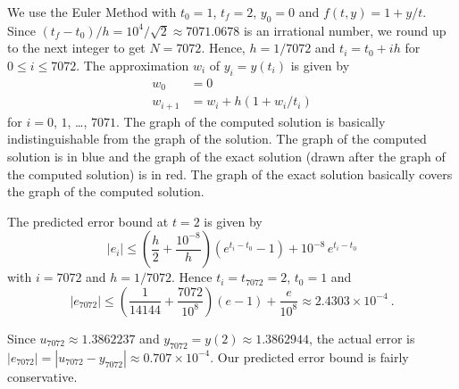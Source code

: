 { We use the Euler Method with $t_0=1$, $t_f= 2$,
$y_0 = 0$ and $f(t,y) = 1 + y/t$.  Since
$\displaystyle (t_f-t_0)/h = 10^4/\sqrt{2} \approx 7071.0678$
is an irrational number, we round up to the next integer to get
$N = 7072$.   Hence, $h = 1/7072$ and $t_i = t_0 + ih$ for
$0\leq i \leq 7072$.  The approximation $w_i$ of $y_i = y(t_i)$ is
given by
\begin{align*}
w_0 & = 0 \\
w_{i+1} & = w_i + h(1 + w_i/t_i)
\end{align*}
for $i=0$, $1$, \ldots, $7071$.   The graph of the computed solution
is basically indistinguishable from the graph of the solution.
The graph of the computed solution is in blue and the graph of the
exact solution (drawn after the graph of the computed solution) is in
red.  The graph of the exact solution basically covers the graph of the
computed solution.

  The predicted error bound at $t=2$ is given by
\[
|e_i| \leq \left(\frac{h}{2} + \frac{10^{-8}}{h} \right)\left(
  e^{t_i-t_0} - 1 \right) + 10^{-8}\,e^{t_i-t_0}
\]
with $i=7072$ and $h=1/7072$.  Hence $t_i = t_{7072} = 2$, $t_0=1$ and
\[
|e_{7072}| \leq \left(\frac{1}{14144} + \frac{7072}{10^8} \right)
( e- 1) + \frac{e}{10^8} \approx 2.4303 \times 10^{-4} \ .
\]

Since $u_{7072} \approx 1.3862237$ and
$y_{7072} = y(2) \approx 1.3862944$, the actual error is
$\displaystyle |e_{7072}| = |u_{7072} - y_{7072}| \approx 0.707 \times 10^{-4}$.
Our predicted error bound is fairly conservative.
}

